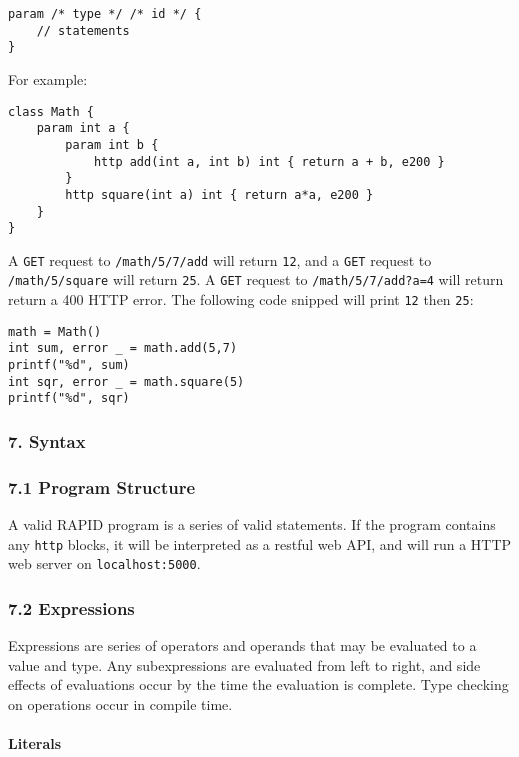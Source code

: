 \begin{verbatim}
param /* type */ /* id */ {
    // statements
}
\end{verbatim}

For example:

\begin{verbatim}
class Math {
    param int a {
        param int b {
            http add(int a, int b) int { return a + b, e200 }
        }
        http square(int a) int { return a*a, e200 }
    }
}
\end{verbatim}

A \texttt{GET} request to \texttt{/math/5/7/add} will return
\texttt{12}, and a \texttt{GET} request to \texttt{/math/5/square} will
return \texttt{25}. A \texttt{GET} request to \texttt{/math/5/7/add?a=4}
will return return a 400 HTTP error. The following code snipped will
print \texttt{12} then \texttt{25}:

\begin{verbatim}
math = Math()
int sum, error _ = math.add(5,7)
printf("%d", sum)
int sqr, error _ = math.square(5)
printf("%d", sqr)
\end{verbatim}

\subsubsection*{7. Syntax}\label{syntax}

\subsubsection*{7.1 Program Structure}\label{program-structure}

A valid RAPID program is a series of valid statements. If the program
contains any \texttt{http} blocks, it will be interpreted as a restful
web API, and will run a HTTP web server on \texttt{localhost:5000}.

\subsubsection*{7.2 Expressions}\label{expressions}

Expressions are series of operators and operands that may be evaluated
to a value and type. Any subexpressions are evaluated from left to
right, and side effects of evaluations occur by the time the evaluation
is complete. Type checking on operations occur in compile time.

\paragraph{Literals}\label{literals-1}

